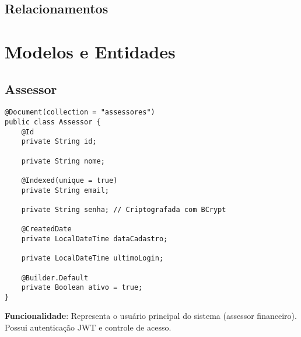 \documentclass[12pt,a4paper]{article}
\begin{document}
\subsection{Relacionamentos}

\begin{center}
\end{center}

\section{Modelos e Entidades}

\subsection{Assessor}

\begin{lstlisting}[caption=Modelo Assessor]
@Document(collection = "assessores")
public class Assessor {
    @Id
    private String id;
    
    private String nome;
    
    @Indexed(unique = true)
    private String email;
    
    private String senha; // Criptografada com BCrypt
    
    @CreatedDate
    private LocalDateTime dataCadastro;
    
    private LocalDateTime ultimoLogin;
    
    @Builder.Default
    private Boolean ativo = true;
}
\end{lstlisting}

\textbf{Funcionalidade}: Representa o usuário principal do sistema (assessor financeiro). Possui autenticação JWT e controle de acesso.
\end{document}
